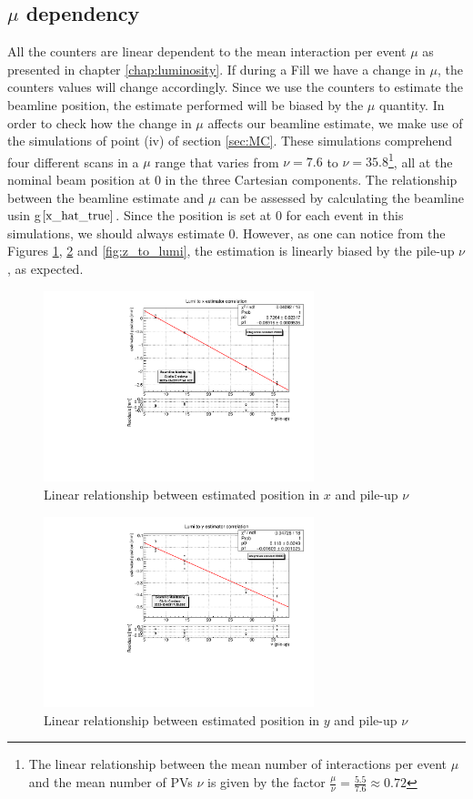 \subsection{$\mu$ dependency}\label{sec:mu_dependency}
All the counters are linear dependent to the mean interaction per event $\mu$ as presented in chapter \ref{chap:luminosity}. If during a Fill we have a change in $\mu$, the counters values will change accordingly. Since we use the counters to estimate the beamline position, the estimate performed will be biased by the $\mu$ quantity. In order to check how the change in $\mu$ affects our beamline estimate, we make use of the simulations 
of point (iv) of section \ref{sec:MC}. These simulations comprehend four different scans in a $\mu$ range that varies from $\nu=7.6$ to $\nu=35.8$\footnote{The linear relationship between the mean number of interactions per event $\mu$ and the mean number of PVs $\nu$ is given by the factor $\tfrac{\mu}{\nu}=\frac{5.5}{7.6}\approx 0.72$}, all at the nominal beam position at $0$ in the three Cartesian components. 
The relationship between the beamline estimate and $\mu$ can be assessed by calculating the beamline usin g$\ref{x_hat_true}$. Since the position is set at 0 for each event in this simulations, we should always estimate 0. However, as one can notice from the Figures \ref{fig:x_to_lumi}, \ref{fig:y_to_lumi} and \ref{fig:z_to_lumi}, the estimation is linearly biased by the pile-up $\nu$, as expected. 
\begin{figure}
    \centering
    \includegraphics[width=0.7\textwidth]{figures/x_to_lumi_fit_20000.pdf}
    \caption{Linear relationship between estimated position in $x$ and pile-up $\nu$}
    \label{fig:x_to_lumi}
\end{figure}
\begin{figure}
    \centering
    \includegraphics[width=0.7\textwidth]{figures/y_to_lumi_fit_20000.pdf}
    \caption{Linear relationship between estimated position in $y$ and pile-up $\nu$}
    \label{fig:y_to_lumi}
\end{figure}
